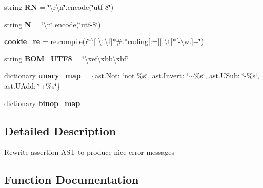 \begin{DoxyCompactItemize}
string {\bfseries RN} = \char`\"{}\textbackslash{}r\textbackslash{}n\char`\"{}.encode(\char`\"{}utf-\/8\char`\"{})
\item 
\mbox{\label{namespace__pytest_1_1assertion_1_1rewrite_a24a3191fa2acdd22d2dbfa0f6c88bd4d}} 
string {\bfseries N} = \char`\"{}\textbackslash{}n\char`\"{}.encode(\char`\"{}utf-\/8\char`\"{})
\item 
\mbox{\label{namespace__pytest_1_1assertion_1_1rewrite_a8ee8f0d371d6a93469ca3e3c73f3af22}} 
{\bfseries cookie\+\_\+re} = re.\+compile(r\char`\"{}$^\wedge$\mbox{[} \textbackslash{}t\textbackslash{}f\mbox{]}$\ast$\#.$\ast$coding\mbox{[}\+:=\mbox{]}\mbox{[} \textbackslash{}t\mbox{]}$\ast$\mbox{[}-\/\textbackslash{}w.\mbox{]}+\char`\"{})
\item 
\mbox{\label{namespace__pytest_1_1assertion_1_1rewrite_a672253c484bd76f7e07f2cca2cf479e7}} 
string {\bfseries B\+O\+M\+\_\+\+U\+T\+F8} = \char`\"{}\textbackslash{}xef\textbackslash{}xbb\textbackslash{}xbf\char`\"{}
\item 
\mbox{\label{namespace__pytest_1_1assertion_1_1rewrite_af8ff719c52c26eb6509a4025d56eb20c}} 
dictionary {\bfseries unary\+\_\+map} = \{ast.\+Not\+: \char`\"{}not \%s\char`\"{}, ast.\+Invert\+: \char`\"{}$\sim$\%s\char`\"{}, ast.\+U\+Sub\+: \char`\"{}-\/\%s\char`\"{}, ast.\+U\+Add\+: \char`\"{}+\%s\char`\"{}\}
\item 
dictionary {\bfseries binop\+\_\+map}
\end{DoxyCompactItemize}


\subsection{Detailed Description}
\begin{DoxyVerb}Rewrite assertion AST to produce nice error messages\end{DoxyVerb}
 

\subsection{Function Documentation}
\mbox{\label{namespace__pytest_1_1assertion_1_1rewrite_a696d660a16415be774be90c6e9ef1bf4}} 
